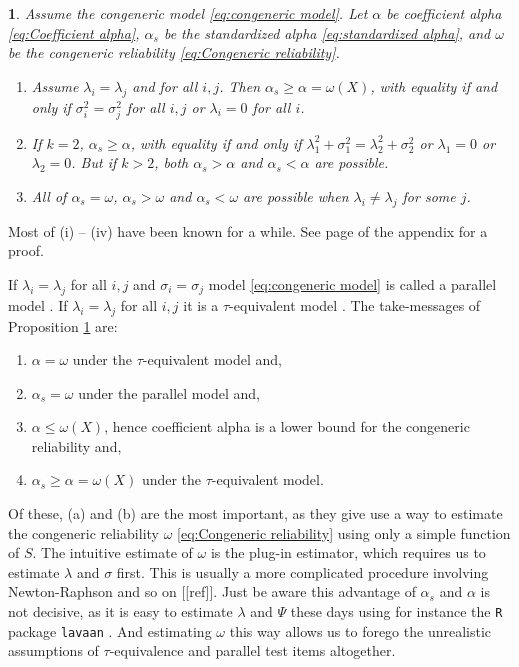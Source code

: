 \documentclass{article}
\makeatletter
\theoremstyle{plain}
\theoremstyle{plain}
\theoremstyle{definition}
\theoremstyle{remark}
\theoremstyle{definition}
\theoremstyle{plain}
\theoremstyle{plain}
\newtheorem{prop}[thm]{\protect\propositionname}
\theoremstyle{definition}
\newenvironment{proof}[1][\protect\proofname]{\par
	\normalfont\topsep6\p@\@plus6\p@\relax
	\trivlist
	\itemindent\parindent
	\item[\hskip\labelsep\scshape #1]\ignorespaces
}{%
	\endtrivlist\@endpefalse
}
\providecommand{\proofname}{Proof}
\providecommand{\propositionname}{Proposition}
\makeatother
\begin{document}
\begin{prop}
\label{prop:Reliabilities.}Assume the congeneric model \eqref{eq:congeneric model}. Let $\alpha$ be coefficient alpha \eqref{eq:Coefficient alpha}, $\alpha_{s}$ be the standardized alpha \eqref{eq:standardized alpha}, and  $\omega$ be the congeneric reliability \eqref{eq:Congeneric reliability}. 
\begin{enumerate}[label=(\roman*)]
\item Assume $\lambda_{i}=\lambda_{j}$ and for all $i,j$. Then $\alpha_s \geq \alpha = \omega(X)$, with equality if and only if $\sigma_{i}^{2}=\sigma_{j}^{2}$ for all $i,j$ or $\lambda_i = 0$ for all $i$.
\item If $k=2$, $\alpha_s\geq\alpha$, with equality if and only if $\lambda_{1}^{2}+\sigma_{1}^{2}=\lambda_{2}^{2}+\sigma_{2}^{2}$ or $\lambda_1 = 0$ or $\lambda_2 = 0$. But if $k>2$, both $\alpha_s>\alpha$
and $\alpha_s<\alpha$ are possible.
\item All of $\alpha_{s}=\omega$, $\alpha_{s}>\omega$ and $\alpha_{s}<\omega$
are possible when $\lambda_{i}\neq\lambda_{j}$ for some $j$.
\end{enumerate}
\end{prop}
\begin{proof}
Most of (i) -- (iv) have been known for a while. See page \pageref{proof:Reliabilities.} of the appendix for a proof.
\end{proof}

If $\lambda_{i}=\lambda_{j}$ for all $i,j$ and $\sigma_{i}=\sigma_{j}$
model \eqref{eq:congeneric model} is called a parallel model \citep[][section 2.13]{Lord1968-ax}. If $\lambda_{i}=\lambda_{j}$
for all $i,j$ it is a $\tau$-equivalent model \citep[][section 2.13]{Lord1968-ax}. The take-messages of Proposition \ref{prop:Reliabilities.} are:

\begin{enumerate}[label=(\alph*)]
\item $\alpha = \omega$ under the $\tau$-equivalent model and,
\item $\alpha_s = \omega$ under the parallel model and,
\item $\alpha \leq \omega(X)$, hence coefficient alpha is a lower bound for the congeneric reliability and,
\item $\alpha_s \geq \alpha = \omega(X)$ under the $\tau$-equivalent model.
\end{enumerate}

Of these, (a) and (b) are the most important, as they give use a way to estimate the congeneric reliability $\omega$ \eqref{eq:Congeneric reliability} using only a simple function of $S$. The intuitive estimate of $\omega$ is the plug-in estimator, which requires us to estimate $\lambda$ and $\sigma$ first. This is usually a more complicated procedure involving Newton-Raphson and so on [[ref]]. Just be aware this advantage of $\alpha_s$ and $\alpha$ is not decisive, as it is easy to estimate $\lambda$ and $\Psi$ these days using for instance the \texttt{R} \citep{Team2013-tt} package \texttt{lavaan} \citep{Rosseel2012-yg}. And estimating $\omega$ this way allows us to forego the unrealistic assumptions of $\tau$-equivalence and parallel test items altogether.
\end{document}
